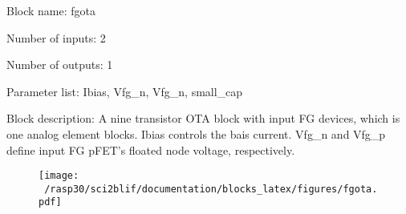 \pagebreak

Block name: fgota

Number of inputs: 2

Number of outputs: 1

Parameter list: Ibias, Vfg\_n, Vfg\_n, small\_cap

Block description: 
A nine transistor OTA block with input FG devices, which is one analog element blocks. Ibias controls the bais current. Vfg\_n and Vfg\_p define input FG pFET's floated node voltage, respectively.

\begin{figure}[H]  %
\texttt{[image: ~/rasp30/sci2blif/documentation/blocks\_latex/figures/fgota.pdf]}
\end{figure}

